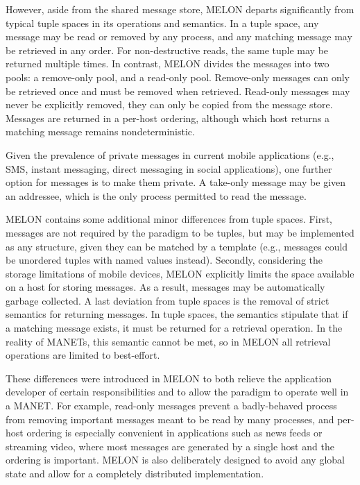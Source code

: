 \documentclass{llncs}
\begin{document}
However, aside from the shared message store, MELON departs significantly from typical tuple spaces in its operations and semantics. In a tuple space, any message may be read or removed by any process, and any matching message may be retrieved in any order. For non-destructive reads, the same tuple may be returned multiple times. In contrast, MELON divides the messages into two pools: a remove-only pool, and a read-only pool. Remove-only messages can only be retrieved once and must be removed when retrieved. Read-only messages may never be explicitly removed, they can only be copied from the message store. Messages are returned in a per-host ordering, although which host returns a matching message remains nondeterministic.

Given the prevalence of private messages in current mobile applications (e.g., SMS, instant messaging, direct messaging in social applications), one further option for messages is to make them private. A take-only message may be given an addressee, which is the only process permitted to read the message.

MELON contains some additional minor differences from tuple spaces. First, messages are not required by the paradigm to be tuples, but may be implemented as any structure, given they can be matched by a template (e.g., messages could be unordered tuples with named values instead). Secondly, considering the storage limitations of mobile devices, MELON explicitly limits the space available on a host for storing messages. As a result, messages may be automatically garbage collected. A last deviation from tuple spaces is the removal of strict semantics for returning messages. In tuple spaces, the semantics stipulate that if a matching message exists, it must be returned for a retrieval operation. In the reality of MANETs, this semantic cannot be met, so in MELON all retrieval operations are limited to best-effort.

These differences were introduced in MELON to both relieve the application developer of certain responsibilities and to allow the paradigm to operate well in a MANET. For example, read-only messages prevent a badly-behaved process from removing important messages meant to be read by many processes, and per-host ordering is especially convenient in applications such as news feeds or streaming video, where most messages are generated by a single host and the ordering is important. MELON is also deliberately designed to avoid any global state and allow for a completely distributed implementation.
\end{document}
